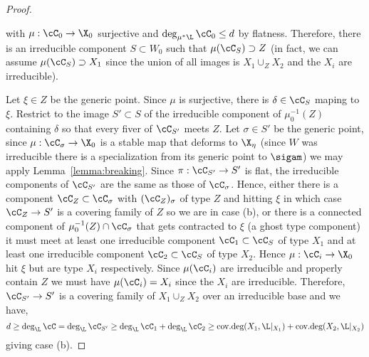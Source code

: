 \documentclass[12pt]{article}
\DeclareMathOperator{\covdeg}{\text{cov.deg}}
\begin{document}
\begin{proof}
\begin{center}
\end{center}
with $\mu : \cC_0 \to \X_0$ surjective and $\deg_{\mu^* \L}\cC_0 \le d$ by flatness. Therefore, there is an irreducible component $S \subset W_0$ such that $\mu(\cC_S) \supset Z$ (in fact, we can assume $\mu(\cC_S) \supset X_1$ since the union of all images is $X_1 \cup_Z X_2$ and the $X_i$ are irreducible).
\par 
Let $\xi \in Z$ be the generic point. Since $\mu$ is surjective, there is $\delta \in \cC_S$ maping to $\xi$. Restrict to the image $S' \subset S$ of the irreducible component of $\mu^{-1}_0(Z)$ containing $\delta$ so that every fiver of $\cC_{S'}$ meets $Z$. Let $\sigma \in S'$ be the generic point, since $\mu : \cC_{\sigma} \to \X_0$ is a stable map that deforms to $\X_{\eta}$ (since $W$ was irreducible there is a specialization from its generic point to $\sigam$) we may apply Lemma~\ref{lemma:breaking}. Since $\pi : \cC_{S'} \to S'$ is flat, the irreducible components of $\cC_{S'}$ are the same as those of $\cC_{\sigma}$. Hence, either there is a component $\cC_Z \subset \cC_{\sigma}$ with $(\cC_Z)_\sigma$ of type $Z$ and hitting $\xi$ in which case $\cC_Z \to S'$ is a covering family of $Z$ so we are in case (b), or there is a connected component of $\mu_0^{-1}(Z) \cap \cC_\sigma$ that gets contracted to $\xi$ (a ghost type component) it must meet at least one irreducible component $\cC_1 \subset \cC_S$ of type $X_1$ and at least one irreducible component $\cC_2 \subset \cC_S$ of type $X_2$. Hence $\mu : \cC_i \to \X_0$ hit $\xi$ but are type $X_i$ respectively. Since $\mu(\cC_i)$ are irreducible and properly contain $Z$ we must have $\mu(\cC_i) = X_i$ since the $X_i$ are irreducible. Therefore, $\cC_{S'} \to S'$ is a covering family of $X_1 \cup_Z X_2$ over an irreducible base and we have,
\[ d \ge \deg_{\L}{\cC} = \deg_{\L}{\cC_{S'}}  \ge \deg_{\L}{\cC_1} + \deg_{\L}{\cC_2} \ge \covdeg(X_1, \L|_{X_1}) + \covdeg(X_2, \L|_{X_2}) \]
giving case (b).
\end{proof}
\end{document}
